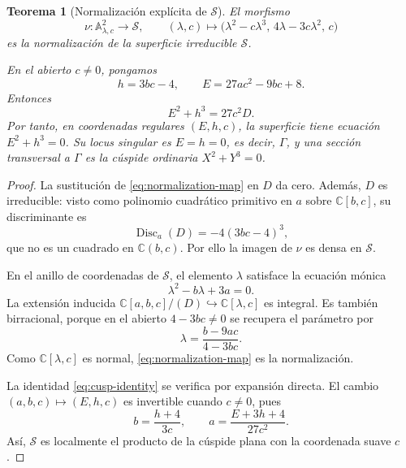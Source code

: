 \documentclass[11pt]{article}
\newtheorem{theorem}{Teorema}[section]
\theoremstyle{definition}
\theoremstyle{remark}
\newcommand{\C}{\mathbb{C}}
\newcommand{\A}{\mathbb{A}}
\begin{document}
\begin{theorem}[Normalizaci\'on expl\'icita de $\mathcal S$]
\label{thm:normalization-cusp}
El morfismo
\begin{equation}\label{eq:normalization-map}
\nu\colon\A^2_{\lambda,c}\longrightarrow\mathcal S,
\qquad
(\lambda,c)\longmapsto
\bigl(\lambda^2-c\lambda^3,\,4\lambda-3c\lambda^2,\,c\bigr)
\end{equation}
es la normalizaci\'on de la superficie irreducible $\mathcal S$.

En el abierto $c\neq0$, pongamos
\begin{equation}\label{eq:cusp-coordinates}
h=3bc-4,\qquad E=27ac^2-9bc+8.
\end{equation}
Entonces
\begin{equation}\label{eq:cusp-identity}
E^2+h^3=27c^2D.
\end{equation}
Por tanto, en coordenadas regulares $(E,h,c)$, la superficie tiene ecuaci\'on
$E^2+h^3=0$. Su locus singular es $E=h=0$, es decir, $\Gamma$, y una secci\'on
transversal a $\Gamma$ es la c\'uspide ordinaria $X^2+Y^3=0$.
\end{theorem}

\begin{proof}
La sustituci\'on de \eqref{eq:normalization-map} en $D$ da cero. Adem\'as,
$D$ es irreducible: visto como polinomio cuadr\'atico primitivo en $a$ sobre
$\C[b,c]$, su discriminante es
\[
\operatorname{Disc}_a(D)=-4(3bc-4)^3,
\]
que no es un cuadrado en $\C(b,c)$. Por ello la imagen de $\nu$ es densa en
$\mathcal S$.

En el anillo de coordenadas de $\mathcal S$, el elemento $\lambda$ satisface
la ecuaci\'on m\'onica
\begin{equation}\label{eq:normalization-integral}
\lambda^2-b\lambda+3a=0.
\end{equation}
La extensi\'on inducida
$\C[a,b,c]/(D)\hookrightarrow\C[\lambda,c]$ es integral. Es tambi\'en
birracional, porque en el abierto $4-3bc\neq0$ se recupera el par\'ametro por
\begin{equation}\label{eq:normalization-birational}
\lambda=\frac{b-9ac}{4-3bc}.
\end{equation}
Como $\C[\lambda,c]$ es normal, \eqref{eq:normalization-map} es la
normalizaci\'on.

La identidad \eqref{eq:cusp-identity} se verifica por expansi\'on directa. El
cambio $(a,b,c)\mapsto(E,h,c)$ es invertible cuando $c\neq0$, pues
\[
b=\frac{h+4}{3c},\qquad a=\frac{E+3h+4}{27c^2}.
\]
As\'i, $\mathcal S$ es localmente el producto de la c\'uspide plana con la
coordenada suave $c$.
\end{proof}
\end{document}
